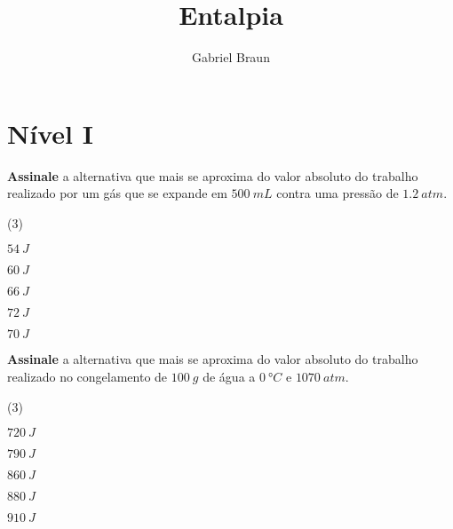\documentclass[braun, twocolumn]{braun}
\title{Entalpia}
\affiliation{Colégio e Curso Pensi, Coordenação de Química}
\author{Gabriel Braun}
\begin{document}
\maketitle
\section{Nível I}


\begin{problem}
[2A01]\textbf{Assinale} a alternativa que mais se aproxima do valor absoluto
do trabalho realizado por um gás que se expande em \(\qty{500}{mL}\)
contra uma pressão de \(\qty{1,2}{atm}\).


\begin{choices}
(3)
\item \(\qty{54}{J}\)

\item \(\qty{60}{J}\)

\item \(\qty{66}{J}\)

\item \(\qty{72}{J}\)

\item \(\qty{70}{J}\)

\end{choices}

\end{problem}



\begin{problem}
[2A02]\textbf{Assinale} a alternativa que mais se aproxima do valor absoluto
do trabalho realizado no congelamento de \(\qty{100}{g}\) de água a
\(\qty{0}{\degree C}\) e \(\qty{1070}{atm}\).


\begin{choices}
(3)
\item \(\qty{720}{J}\)

\item \(\qty{790}{J}\)

\item \(\qty{860}{J}\)

\item \(\qty{880}{J}\)

\item \(\qty{910}{J}\)

\end{choices}

\end{problem}
\end{document}

